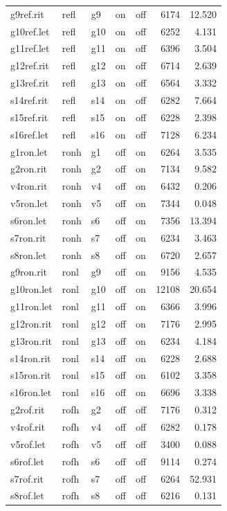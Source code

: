 \begin{footnotesize}
\begin{longtable}{lllllrr}
g9ref.rit & refl & g9 & on & off & 6174 & 12.520 \\
g10ref.let & refl & g10 & on & off & 6252 & 4.131 \\
g11ref.let & refl & g11 & on & off & 6396 & 3.504 \\
g12ref.rit & refl & g12 & on & off & 6714 & 2.639 \\
g13ref.rit & refl & g13 & on & off & 6564 & 3.332 \\
s14ref.rit & refl & s14 & on & off & 6282 & 7.664 \\
s15ref.rit & refl & s15 & on & off & 6228 & 2.398 \\
s16ref.let & refl & s16 & on & off & 7128 & 6.234 \\
g1ron.let & ronh & g1 & off & on & 6264 & 3.535 \\
g2ron.rit & ronh & g2 & off & on & 7134 & 9.582 \\
v4ron.rit & ronh & v4 & off & on & 6432 & 0.206 \\
v5ron.let & ronh & v5 & off & on & 7344 & 0.048 \\
s6ron.let & ronh & s6 & off & on & 7356 & 13.394 \\
s7ron.rit & ronh & s7 & off & on & 6234 & 3.463 \\
s8ron.let & ronh & s8 & off & on & 6720 & 2.657 \\
g9ron.rit & ronl & g9 & off & on & 9156 & 4.535 \\
g10ron.let & ronl & g10 & off & on & 12108 & 20.654 \\
g11ron.let & ronl & g11 & off & on & 6366 & 3.996 \\
g12ron.rit & ronl & g12 & off & on & 7176 & 2.995 \\
g13ron.rit & ronl & g13 & off & on & 6234 & 4.184 \\
s14ron.rit & ronl & s14 & off & on & 6228 & 2.688 \\
s15ron.rit & ronl & s15 & off & on & 6102 & 3.358 \\
s16ron.let & ronl & s16 & off & on & 6696 & 3.338 \\
g2rof.rit & rofh & g2 & off & off & 7176 & 0.312 \\
v4rof.rit & rofh & v4 & off & off & 6282 & 0.178 \\
v5rof.let & rofh & v5 & off & off & 3400 & 0.088 \\
s6rof.let & rofh & s6 & off & off & 9114 & 0.274 \\
s7rof.rit & rofh & s7 & off & off & 6264 & 52.931 \\
s8rof.let & rofh & s8 & off & off & 6216 & 0.131 \\

\end{longtable}
\end{footnotesize}
